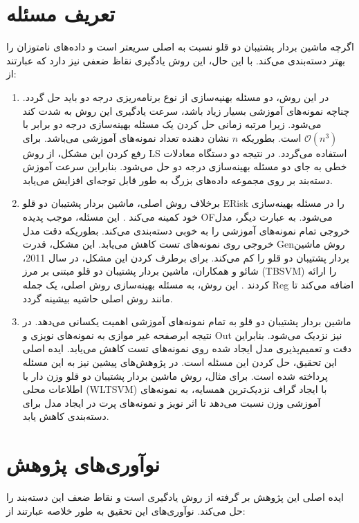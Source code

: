 \section{تعریف مسئله} \label{sec:1:2}
اگرچه ماشین بردار پشتیبان دو قلو نسبت به  اصلی سریعتر است و داده‌های نامتوزان را بهتر دسته‌بندی می‌کند. با این حال، این روش یادگیری نقاظ ضعفی نیز دارد که عبارتند از:
\begin{enumerate}
	\item 	در این روش، دو مسئله بهنیه‌سازی از نوع برنامه‌ریزی درجه دو باید حل گردد. چناچه نمونه‌های آموزشی بسیار زیاد باشد، سرعت یادگیری این روش به شدت کند می‌شود. زیرا مرتبه زمانی حل کردن یک مسئله بهینه‌سازی درجه دو برابر با $\mathcal{O}(n^3)$ است. بطوریکه $n$ نشان دهنده تعداد نمونه‌های آموزشی می‌باشد. برای رفع کردن این مشکل، از روش \gls{LS}  \cite{kumar2009} استفاده می‌گردد. در نتیجه دو دستگاه معادلات خطی به جای دو مسئله بهینه‌سازی درجه دو حل می‌شود. بنابراین سرعت آموزش دسته‌بند بر روی مجموعه داده‌های بزرگ به طور قابل توجه‌ای افزایش می‌یابد.
	\item برخلاف روش  اصلی، ماشین بردار پشتیبان دو قلو \gls{ERisk} را در مسئله بهینه‌سازی خود کمینه می‌کند .\cite{shao2011} این مسئله، موجب پدیده  \gls{OF}می‌شود. به عبارت دیگر، مدل خروجی تمام نمونه‌های آموزشی را به خوبی دسته‌بندی می‌کند. بطوریکه دقت مدل خروجی روی نمونه‌های تست کاهش می‌یابد. این مشکل، قدرت  \gls{Gen}روش ماشین بردار پشتیبان دو قلو را کم می‌کند. برای برطرف کردن این مشکل، در سال 2011، شائو و همکاران، ماشین بردار پشتیبان دو قلو مبتنی بر مرز  (\gls{TBSVM}) را ارائه کردند \cite{shao2011}. این روش، به مسئله بهینه‌سازی روش  اصلی، یک جمله  \gls{Reg} اضافه می‌کند تا مانند روش  اصلی حاشیه بیشینه گردد.
	\item ماشین بردار پشتیبان دو قلو به تمام نمونه‌های آموزشی اهمیت یکسانی می‌دهد. در نتیجه ابرصفحه غیر موازی به نمونه‌های نویزی و \gls{Out} نیز نزدیک می‌شود. بنابراین دقت و تعمیم‌پذیری مدل ایجاد شده روی نمونه‌های تست کاهش می‌یابد. ایده اصلی این تحقیق، حل کردن این مسئله است. در پژوهش‌های پیشین نیز به این مسئله پرداخته شده است. برای مثال، روش ماشین بردار پشتیبان دو قلو وزن دار با اطلاعات محلی (\gls{WLTSVM}) \cite{ye2012} با ایجاد گراف نزدیک‌ترین همسایه، به نمونه‌های آموزشی وزن نسبت می‌دهد تا اثر نویز و نمونه‌های پرت در ایجاد مدل برای دسته‌بندی کاهش یابد.
\end{enumerate}

\section{نوآوری‌های پژوهش} \label{sec:1:3}
ایده اصلی این پژوهش بر گرفته از روش یادگیری   \cite{ye2012} است و نقاط ضعف این دسته‌بند را حل می‌کند. نوآوری‌های این تحقیق به طور خلاصه عبارتند از:

